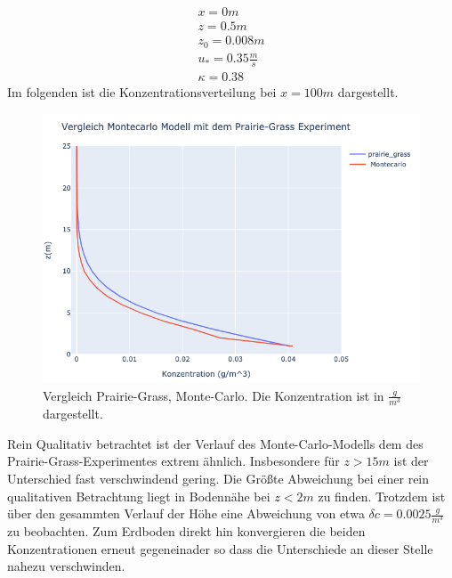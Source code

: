 \documentclass[ngerman]{scrartcl}
\begin{document}
\begin{align}
	x=0 \si{m} \\
	z= 0.5 \si{m} \\
	z_0 = 0.008 \si{m} \\
	u_{*}=0.35 \frac{\si{m}}{\si{s}}\\
	\kappa =0.38
\end{align}
Im folgenden ist die Konzentrationsverteilung bei $x=100\si{m}$ dargestellt.
\begin{figure}[H]
	\centering
	\includegraphics[scale=0.5]{Bilder/2.png}
	\caption{Vergleich Prairie-Grass, Monte-Carlo.  Die Konzentration ist in $\frac{\si{g}}{\si{m^3}}$ dargestellt.}
	\label{fig:my_label}
\end{figure}
Rein Qualitativ betrachtet ist der Verlauf des Monte-Carlo-Modells dem des Prairie-Grass-Experimentes extrem ähnlich. Insbesondere für $z>15 \si{m}$ ist der Unterschied fast verschwindend gering. Die Größte Abweichung bei einer rein qualitativen Betrachtung liegt in Bodennähe bei $z<2 \si{m}$ zu finden.  Trotzdem ist über den gesammten Verlauf der Höhe eine Abweichung von etwa $\delta c=0.0025 \frac{\si{g}}{\si{m^3}} $
zu beobachten. Zum Erdboden direkt hin konvergieren die beiden Konzentrationen erneut gegeneinader so dass die Unterschiede an dieser Stelle nahezu verschwinden. 
\end{document}

